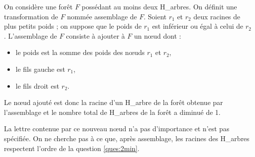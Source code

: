 \medskip

On considère une forêt $F$ possédant au moins deux H\_arbres. On définit une transformation de $F$
nommée assemblage de $F$. Soient $r_1$ et $r_2$ deux racines de plus petits poids ; on suppose que le poids de $r_1$
est inférieur ou égal à celui de $r_2$ . L’assemblage de $F$ consiste à ajouter à $F$ un nœud dont :
\begin{itemize}
  \item le poids est la somme des poids des nœuds $r_1$ et $r_2$,
  \item le fils gauche est $r_1$,
  \item le fils droit est $r_2$.
\end{itemize}
Le nœud ajouté est donc la racine d’un H\_arbre de la forêt obtenue par l’assemblage et le nombre total de H\_arbres de la forêt a diminué de 1.

La lettre contenue par ce nouveau nœud n’a pas d’importance et n’est pas spécifiée. On ne cherche pas à
ce que, après assemblage, les racines des H\_arbres respectent l’ordre de la question \ref{ques:2min}.

